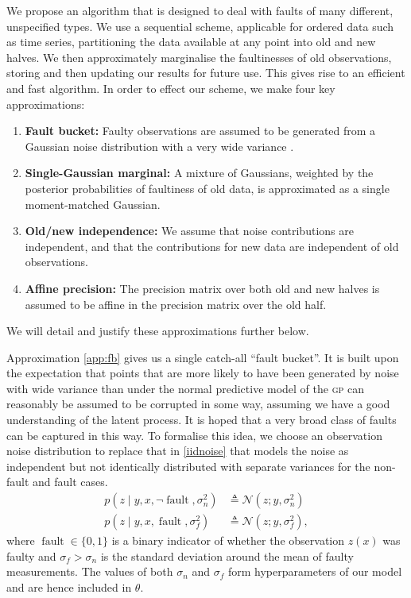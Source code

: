 \documentclass{article} %
\newcommand{\deq}{\ensuremath{\triangleq}}
\newcommand{\given}{\!\ensuremath{\mid}\!}
\newcommand{\cm}[1]{\ensuremath{\mathcal{#1}}}
\newcommand{\acro}[1]{\textsc{#1}}
\DeclareMathOperator{\fault}{fault}
\begin{document}
We propose an algorithm that is designed to deal with faults of many different, unspecified types. We use a sequential scheme, applicable for ordered data such as time series, partitioning the data available at any point into old and new halves.  We then approximately marginalise the faultinesses of old observations, storing and then updating our results for future use. This gives rise to an efficient and fast algorithm. In order to effect our scheme, we make four key approximations:
\begin{enumerate}
 \item \label{app:fb} {\bf Fault bucket:} Faulty observations are assumed to be generated from a Gaussian noise distribution with a very wide variance .
\item \label{app:single_gaussian} {\bf Single-Gaussian marginal:} A mixture of Gaussians, weighted by the posterior probabilities of faultiness of old data, is approximated as a single moment-matched Gaussian.
\item \label{app:independence} {\bf Old/new independence:} We assume that noise contributions are independent, and that the contributions for new data are independent of old observations.
\item \label{app:affine} {\bf Affine precision:} The precision matrix over both old and new halves is assumed to be affine in the precision matrix over the old half.
\end{enumerate}
We will detail and justify these approximations further below.

Approximation \ref{app:fb} gives us a single catch-all ``fault bucket''. It is built upon the expectation that points that are more likely to have been generated by noise with wide variance than under the normal
predictive model of the \acro{gp} can reasonably be assumed to
be corrupted in some way, assuming we have a good understanding of the
latent process. It is hoped that a very broad class of faults can be
captured in this way. 
To formalise this idea, we choose an observation noise distribution to
replace that in \eqref{iidnoise} that models the noise as independent
but not identically distributed with separate variances for the
non-fault and fault cases.
\begin{align*}
 p(z \given y, x, \neg\fault, \sigma_n^2)
 &
 \deq
 \cm{N}(z; y, \sigma_n^2)
 \\
 p(z \given y, x, \fault, \sigma_f^2)
 &
 \deq
 \cm{N}(z; y, \sigma_f^2),
\end{align*}
where $\fault \in \lbrace 0, 1 \rbrace$ is a binary indicator of
whether the observation $z(x)$ was faulty and $\sigma_f > \sigma_n$ is
the standard deviation around the mean of faulty measurements.  The
values of both $\sigma_n$ and $\sigma_f$ form hyperparameters of our
model and are hence included in $\theta$.
\end{document}
